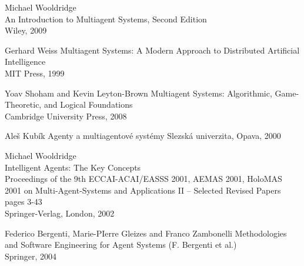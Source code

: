 
\begin{thebibliography}{99}


Michael Wooldridge\\
An Introduction to Multiagent Systems, Second Edition\\
Wiley, 2009

Gerhard Weiss
Multiagent Systems: A Modern Approach to Distributed Artificial Intelligence\\
MIT Press, 1999

Yoav Shoham and Kevin Leyton-Brown
Multiagent Systems: Algorithmic, Game-Theoretic, and Logical Foundations\\
Cambridge University Press, 2008

Aleš Kubík
Agenty a multiagentové systémy
Slezská univerzita, Opava, 2000

Michael Wooldridge\\
Intelligent Agents: The Key Concepts\\
Proceedings of the 9th ECCAI-ACAI/EASSS 2001, AEMAS 2001, HoloMAS 2001 on Multi-Agent-Systems and Applications II -- Selected Revised Papers\\
pages 3-43\\
Springer-Verlag, London, 2002 


Federico Bergenti, Marie-PIerre Gleizes and Franco Zambonelli
Methodologies and Software Engineering for Agent Systems (F. Bergenti et al.)\\
Springer, 2004


\end{thebibliography}
